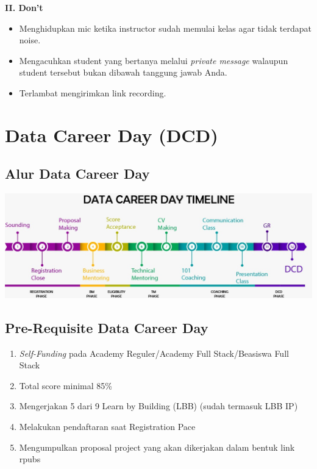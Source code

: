 \documentclass[
]{book}
\providecommand{\tightlist}{%
  \setlength{\itemsep}{0pt}\setlength{\parskip}{0pt}}
\begin{document}
\textbf{II. Don't}

\begin{itemize}
\tightlist
\item
  Menghidupkan mic ketika instructor sudah memulai kelas agar tidak terdapat noise.
\item
  Mengacuhkan student yang bertanya melalui \emph{private message} walaupun student tersebut bukan dibawah tanggung jawab Anda.
\item
  Terlambat mengirimkan link recording.
\end{itemize}

\hypertarget{data-career-day-dcd}{%
\chapter{Data Career Day (DCD)}\label{data-career-day-dcd}}

\hypertarget{alur-data-career-day}{%
\section{Alur Data Career Day}\label{alur-data-career-day}}

\includegraphics{assets/DCD pace.jpeg}

\hypertarget{pre-requisite-data-career-day}{%
\section{Pre-Requisite Data Career Day}\label{pre-requisite-data-career-day}}

\begin{enumerate}
\def\labelenumi{\arabic{enumi}.}
\tightlist
\item
  \emph{Self-Funding} pada Academy Reguler/Academy Full Stack/Beasiswa Full Stack
\item
  Total score minimal 85\%
\item
  Mengerjakan 5 dari 9 Learn by Building (LBB) (sudah termasuk LBB IP)
\item
  Melakukan pendaftaran saat Registration Pace
\item
  Mengumpulkan proposal project yang akan dikerjakan dalam bentuk link rpubs
\end{enumerate}
\end{document}
